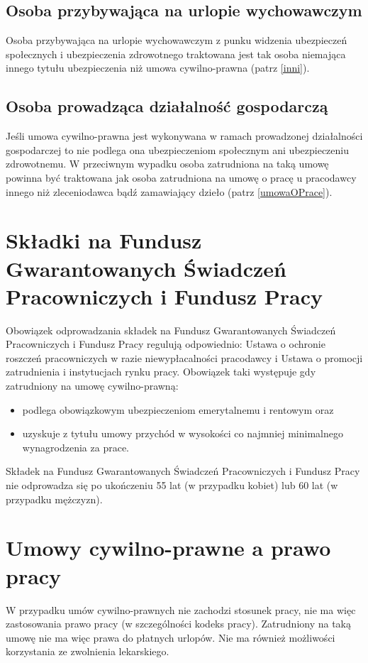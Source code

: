 \subsection[Osoba przybywająca na urlopie wychowawczym][Osoba przybywająca na urlopie wychowawczym]{Osoba przybywająca na urlopie wychowawczym}
Osoba przybywająca na urlopie wychowawczym z punku widzenia ubezpieczeń społecznych i ubezpieczenia zdrowotnego traktowana jest tak osoba niemająca innego tytułu ubezpieczenia niż umowa cywilno-prawna (patrz \ref{inni}).

\subsection[Osoba prowadząca działalność gospodarczą][Osoba prowadząca działalność gospodarczą]{Osoba prowadząca działalność gospodarczą}
Jeśli umowa cywilno-prawna jest wykonywana w ramach prowadzonej działalności gospodarczej to nie podlega ona ubezpieczeniom społecznym ani ubezpieczeniu zdrowotnemu. W przeciwnym wypadku osoba zatrudniona na taką umowę powinna być traktowana jak osoba zatrudniona na umowę o pracę u pracodawcy innego niż zleceniodawca bądź zamawiający dzieło (patrz \ref{umowaOPrace}).

\section{Składki na Fundusz Gwarantowanych Świadczeń Pracowniczych i Fundusz Pracy}
Obowiązek odprowadzania składek na Fundusz Gwarantowanych Świadczeń Pracowniczych i Fundusz Pracy regulują odpowiednio: Ustawa o ochronie roszczeń pracowniczych w razie niewypłacalności pracodawcy\cite{ustawaOOchronieRoszczen} i Ustawa o promocji zatrudnienia i instytucjach rynku pracy\cite{ustawaOPromocjiZatrudnienia}. Obowiązek taki występuje gdy zatrudniony na umowę cywilno-prawną:
\begin{itemize}
	\item podlega obowiązkowym ubezpieczeniom emerytalnemu i rentowym oraz
	\item uzyskuje z tytułu umowy przychód w wysokości co najmniej minimalnego wynagrodzenia za prace.
\end{itemize}
Składek na Fundusz Gwarantowanych Świadczeń Pracowniczych i Fundusz Pracy nie odprowadza się po ukończeniu 55 lat (w przypadku kobiet) lub 60 lat (w przypadku mężczyzn).

\section[Umowy cywilno-prawne a prawo pracy][Umowy cywilno-prawne a prawo pracy]{Umowy cywilno-prawne a prawo pracy}
W przypadku umów cywilno-prawnych nie zachodzi stosunek pracy, nie ma więc zastosowania prawo pracy (w szczególności kodeks pracy). Zatrudniony na taką umowę nie ma więc prawa do płatnych urlopów. Nie ma również możliwości korzystania ze zwolnienia lekarskiego.

